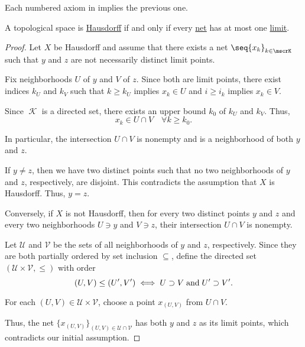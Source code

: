 \begin{proposition}\label{thm:separation_axioms_cascade}
  Each numbered axiom in  implies the previous one.
\end{proposition}

\begin{proposition}\label{thm:t2_iff_singleton_limits}
  A topological space is \hyperref[def:separation_axioms/T2]{Hausdorff} if and only if every \hyperref[def:topological_net]{net} has at most one \hyperref[def:net_limit_point]{limit}.
\end{proposition}
\begin{proof}
  \SufficiencySubProof Let \( X \) be Hausdorff and assume that there exists a net \( \seq{ x_k }_{k \in \mscrK} \) such that \( y \) and \( z \) are not necessarily distinct limit points.

  Fix neighborhoods \( U \) of \( y \) and \( V \) of \( z \). Since both are limit points, there exist indices \( k_U \) and \( k_V \) such that \( k \geq k_U \) implies \( x_k \in U \) and \( i \geq i_k \) implies \( x_k \in V \).

  Since \( \mscrK \) is a directed set, there exists an upper bound \( k_0 \) of \( k_U \) and \( k_V \). Thus,
  \begin{equation*}
    x_k \in U \cap V \quad\forall k \geq k_0.
  \end{equation*}

  In particular, the intersection \( U \cap V \) is nonempty and is a neighborhood of both \( y \) and \( z \).

  If \( y \neq z \), then we have two distinct points such that no two neighborhoods of \( y \) and \( z \), respectively, are disjoint. This contradicts the assumption that \( X \) is Hausdorff. Thus, \( y = z \).

  \NecessitySubProof Conversely, if \( X \) is not Hausdorff, then for every two distinct points \( y \) and \( z \) and every two neighborhoods \( U \ni y \) and \( V \ni z \), their intersection \( U \cap V \) is nonempty.

  Let \( \mathcal{U} \) and \( \mathcal{V} \) be the sets of all neighborhoods of \( y \) and \( z \), respectively. Since they are both partially ordered by set inclusion \( \subseteq \), define the directed set \( (\mathcal{U} \times \mathcal{V}, \leq) \) with order
  \begin{equation*}
    (U, V) \leq (U', V') \iff U \supset V \T{and} U' \supset V'.
  \end{equation*}

  For each \( (U, V) \in \mathcal{U} \times \mathcal{V} \), choose a point \( x_{(U, V)} \) from \( U \cap V \).

  Thus, the net \( \{ x_{(U, V)} \}_{(U, V) \in \mathcal{U} \cap \mathcal{V}} \) has both \( y \) and \( z \) as its limit points, which contradicts our initial assumption.
\end{proof}

